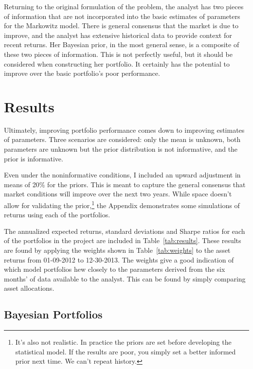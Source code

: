 \documentclass[a4paper]{article}\usepackage[]{graphicx}\usepackage[]{color}
\begin{document}
Returning to the original formulation of the problem, the analyst has two pieces of information that are not incorporated into the basic estimates of parameters for the Markowitz model. There is general consensus that the market is due to improve, and the analyst has extensive historical data to provide context for recent returns. Her Bayesian prior, in the most general sense, is a composite of these two pieces of information. This is not perfectly useful, but it should be considered when constructing her portfolio. It certainly has the potential to improve over the basic portfolio's poor performance.

\section{Results}

Ultimately, improving portfolio performance comes down to improving estimates of parameters. Three scenarios are considered: only the mean is unknown, both parameters are unknown but the prior distribution is not informative, and the prior is informative.

Even under the noninformative conditions, I included an upward adjustment in means of 20\% for the priors. This is meant to capture the general consensus that market conditions will improve over the next two years. While space doesn't allow for validating the prior,\footnote{It's also not realistic. In practice the priors are set before developing the statistical model. If the results are poor, you simply set a better informed prior next time. We can't repeat history.} the Appendix demonstrates some simulations of returns using each of the portfolios. 

The annualized expected returns, standard deviations and Sharpe ratios for each of the portfolios in the project are included in Table~\ref{tab:results}. These results are found by applying the weights shown in Table~\ref{tab:weights} to the asset returns from 01-09-2012 to 12-30-2013. The weights give a good indication of which model portfolios hew closely to the parameters derived from the six months' of data available to the analyst. This can be found by simply comparing asset allocations.

\subsection{Bayesian Portfolios}
\end{document}
